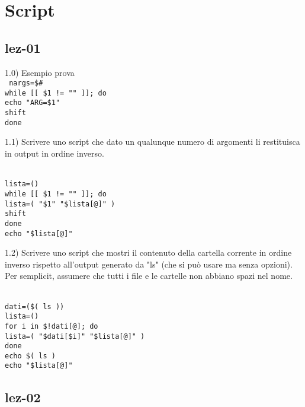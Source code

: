 \section{Script}
\subsection{lez-01}
\begin{flushleft}
  1.0) Esempio prova \\
  \texttt{
  nargs=\$\# \\
  while [[ \$1 != "" ]]; do \\
    \tab echo "ARG=\$1" \\
    \tab shift \\
  done}\\
\end{flushleft}

\begin{flushleft}
  1.1) Scrivere uno script che dato un qualunque numero di argomenti li restituisca in 
  output in ordine inverso.
  
  \texttt{\\
  lista=()\\
  while [[ \$1 != "" ]]; do \\
   \tab lista=( "\$1" "\${lista[@]}" )\\
   \tab shift\\
  done \\
  echo "\${lista[@]}"}\\
\end{flushleft}

\begin{flushleft}
  1.2) Scrivere uno script che mostri il contenuto della cartella corrente in ordine 
  inverso rispetto all'output generato da "ls" (che si può usare ma senza opzioni). 
  Per semplicit\aca, assumere che tutti i file e le cartelle non abbiano spazi nel nome.
  
  \texttt{\\dati=(\$( ls ))\\
  lista=()\\
  for i in \${!dati[@]}; do \\
    \tab lista=( "\${dati[\$i]}" "\${lista[@]}" )\\
  done \\
  echo \$( ls )\\
  echo "\${lista[@]}"}
\end{flushleft}

\subsection{lez-02}


